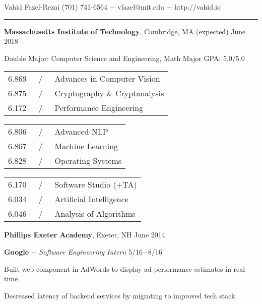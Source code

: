 \documentclass[11pt]{article}
\newcommand{\msection}[1]{\vspace{1em}\marginnote{#1}} %
\newcommand{\bt}[1]{\textbf{#1}} %
\newcommand{\gap}[0]{\vspace{0.6em}} %
\newcommand{\dash}[0]{ $-$ } %
\newcommand{\tabsep}[0]{\, / \,} %
\begin{document}

{\Huge Vahid Fazel-Rezai} \hfill  (701) 741-6564\dash vfazel@mit.edu\dash http://vahid.io

\vspace{0.4em}

\hspace{-1.2in}\rule{7.9in}{0.2em}

\vspace{-0.2em}



\msection{Education}

\bt{Massachusetts Institute of Technology}, Cambridge, MA \hfill (expected) June 2018

Double Major: Computer Science and Engineering, Math \hfill Major GPA: 5.0/5.0


\vspace{0.15em}
\begin{tabular}{rcl}
6.869 & \tabsep & Advances in Computer Vision \\
6.875 & \tabsep & Cryptography \& Cryptanalysis \\
6.172 & \tabsep & Performance Engineering \\
\end{tabular}
\hfill
\begin{tabular}{rcl}
6.806 & \tabsep & Advanced NLP \\
6.867 & \tabsep & Machine Learning \\
6.828 & \tabsep & Operating Systems \\
\end{tabular}
\hfill
\begin{tabular}{rcl}
6.170 & \tabsep & Software Studio (+TA) \\
6.034 & \tabsep & Artificial Intelligence \\
6.046 & \tabsep & Analysis of Algorithms \\
\end{tabular}

\gap

\bt{Phillips Exeter Academy}, Exeter, NH \hfill June 2014



\msection{Work}

\bt{Google}\dash \emph{Software Engineering Intern} \hfill 5/16$-$8/16

Built web component in AdWords to display ad performance estimates in real-time

Decreased latency of backend services by migrating to improved tech stack
\end{document}
